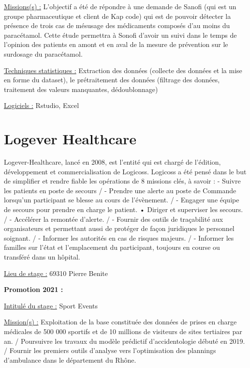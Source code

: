 \documentclass[
  letterpaper,
  DIV=11,
  numbers=noendperiod]{scrreprt}
\begin{document}
\uline{Missions(s) :} L'objectif a été de répondre à une demande de
Sanofi (qui est un groupe pharmaceutique et client de Kap code) qui est
de pouvoir détecter la présence de trois cas de mésusage des médicaments
composés d'au moins du paracétamol. Cette étude permettra à Sonofi
d'avoir un suivi dans le temps de l'opinion des patients en amont et en
aval de la mesure de prévention sur le surdosage du paracétamol.

\uline{Techniques statistiques :} Extraction des données (collecte des
données et la mise en forme du dataset), le prétraitement des données
(filtrage des données, traitement des valeurs manquantes, dédoublonnage)

\uline{Logiciels :} Rstudio, Excel

\hypertarget{logever-healthcare}{%
\section{\texorpdfstring{\textbf{Logever
Healthcare}}{Logever Healthcare}}\label{logever-healthcare}}

Logever-Healthcare, lancé en 2008, est l'entité qui est chargé de
l'édition, développement et commercialisation de Logicoss. Logicoss a
été pensé dans le but de simplifier et rendre fiable les opérations de 8
missions clés, à savoir : - Suivre les patients en poste de secours / -
Prendre une alerte au poste de Commande lorsqu'un participant se blesse
au cours de l'évènement. / - Engager une équipe de secours pour prendre
en charge le patient. • Diriger et superviser les secours. / - Accélérer
la remontée d'alerte. / - Fournir des outils de traçabilité aux
organisateurs et permettant aussi de protéger de façon juridiques le
personnel soignant. / - Informer les autorités en cas de risques
majeurs. / - Informer les familles sur l'état et l'emplacement du
participant, toujours en course ou transféré dans un hôpital.

\uline{Lieu de stage :} 69310 Pierre Benite

\textbf{Promotion 2021 :}

\uline{Intitulé du stage :} Sport Events

\uline{Mission(s) :} Exploitation de la base constituée des données de
prises en charge médicales de 500 000 sportifs et de 10 millions de
visiteurs de sites tertiaires par an. / Poursuivre les travaux du modèle
prédictif d'accidentologie débuté en 2019. / Fournir les premiers outils
d'analyse vers l'optimisation des plannings d'ambulance dans le
département du Rhône.
\end{document}
